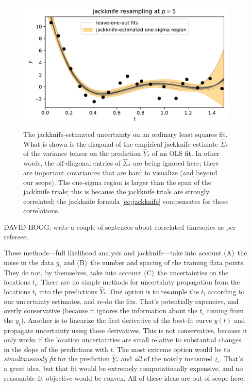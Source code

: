 \documentclass[12pt,letterpaper]{article}
\newlength{\figurewidth}
\begin{document}
\begin{figure}[t]
    \begin{mdframed}
    \includegraphics[width=\figurewidth]{./uncertainty.pdf}
    \caption{The jackknife-estimated uncertainty on an ordinary least squares fit. What is shown is the diagonal of the empirical jackknife estimate $\hat{\Sigma}_\ast$ of the variance tensor on the prediction $\hat{Y}_\ast$ of an OLS fit. In other words, the off-diagonal entries of $\hat{\Sigma}_\ast$ are being ignored here; there are important covariances that are hard to visualize (and beyond our scope). The one-sigma region is larger than the span of the jackknife trials; this is because the jackknife trials are strongly correlated; the jackknife formula \eqref{eq:jackknife} compensates for those correlations.}
    \label{fig:uncertainty}
    \end{mdframed}
\end{figure}

DAVID HOGG: write a couple of sentences about correlated timeseries as per refereee. 

These methods---full likelihood analysis and jackknife---take into account (A)~the noise in the data $y_i$ and (B)~the number and spacing of the training data points.
They do not, by themselves, take into account (C)~the uncertainties on the locations $t_i$.
There are no simple methods for uncertainty propagation from the locations $t_i$ into the predictions $\hat{Y}_\ast$.
One option is to resample the $t_i$ according to our uncertainty estimates, and re-do the fits.
That's potentially expensive, and overly conservative (because it ignores the information about the $t_i$ coming from the $y_i$).
Another is to linearize the first derivative of the best-fit curve $y(t)$ and propagate uncertainty using those derivatives.
This is not conservative, because it only works if the location uncertainties are small relative to substantial changes in the slope of the predictions with $t$.
The most extreme option would be to \emph{simultaneously fit} for the prediction $\hat{Y}_\ast$ and \emph{all} of the noisily measured $t_i$.
That's a great idea, but that fit would be extremely computationally expensive, and no reasonable fit objective would be convex.
All of these ideas are out of scope here.
\end{document}
